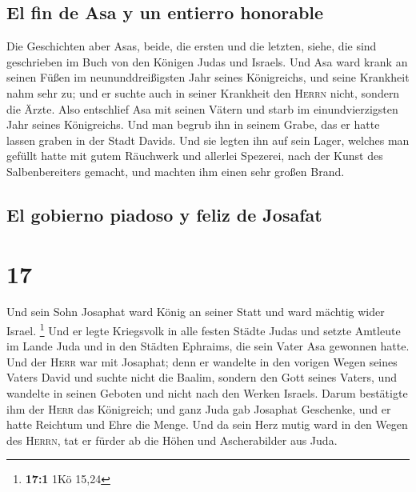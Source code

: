 \hypertarget{el-fin-de-asa-y-un-entierro-honorable}{%
\subsection{El fin de Asa y un entierro
honorable}\label{el-fin-de-asa-y-un-entierro-honorable}}

 Die Geschichten aber Asas, beide, die ersten und die
letzten, siehe, die sind geschrieben im Buch von den Königen Judas und
Israels.  Und Asa ward krank an seinen Füßen im
neununddreißigsten Jahr seines Königreichs, und seine Krankheit nahm
sehr zu; und er suchte auch in seiner Krankheit den \textsc{Herrn}
nicht, sondern die Ärzte.  Also entschlief Asa mit seinen
Vätern und starb im einundvierzigsten Jahr seines Königreichs.
 Und man begrub ihn in seinem Grabe, das er hatte lassen
graben in der Stadt Davids. Und sie legten ihn auf sein Lager, welches
man gefüllt hatte mit gutem Räuchwerk und allerlei Spezerei, nach der
Kunst des Salbenbereiters gemacht, und machten ihm einen sehr großen
Brand.

\hypertarget{el-gobierno-piadoso-y-feliz-de-josafat}{%
\subsection{El gobierno piadoso y feliz de
Josafat}\label{el-gobierno-piadoso-y-feliz-de-josafat}}

\hypertarget{section-16}{%
\section{17}\label{section-16}}

 Und sein Sohn Josaphat ward König an seiner Statt und
ward mächtig wider Israel. \footnote{\textbf{17:1} 1Kö 15,24}
 Und er legte Kriegsvolk in alle festen Städte Judas und
setzte Amtleute im Lande Juda und in den Städten Ephraims, die sein
Vater Asa gewonnen hatte.  Und der \textsc{Herr} war mit
Josaphat; denn er wandelte in den vorigen Wegen seines Vaters David und
suchte nicht die Baalim,  sondern den Gott seines Vaters,
und wandelte in seinen Geboten und nicht nach den Werken Israels.
 Darum bestätigte ihm der \textsc{Herr} das Königreich;
und ganz Juda gab Josaphat Geschenke, und er hatte Reichtum und Ehre die
Menge.  Und da sein Herz mutig ward in den Wegen des
\textsc{Herrn}, tat er fürder ab die Höhen und Ascherabilder aus Juda.

